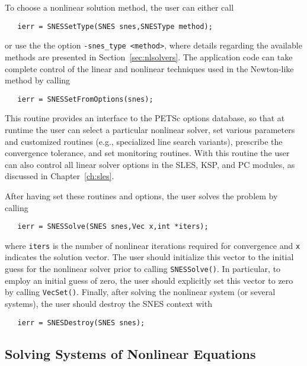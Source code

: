 To choose a nonlinear solution method, the user can either
call 
\begin{verbatim}
   ierr = SNESSetType(SNES snes,SNESType method);
\end{verbatim}
or use the the option {\tt -snes\_type <method>},  
where details regarding the available methods are presented in
Section~\ref{sec:nlsolvers}.
The application code can take complete control of the linear and
nonlinear techniques used in the Newton-like method by calling
\begin{verbatim}
   ierr = SNESSetFromOptions(snes);
\end{verbatim}
This routine provides an interface to the PETSc options database, so
that at runtime the user can select a particular nonlinear solver, set
various parameters and customized routines (e.g., specialized line
search variants), prescribe the convergence tolerance, and set
monitoring routines.  With this routine the user can also control all
linear solver options in the SLES, KSP, and PC modules, as discussed
in Chapter~\ref{ch:sles}.

After having set these routines and options, the user
solves the problem by calling 
\begin{verbatim}
   ierr = SNESSolve(SNES snes,Vec x,int *iters);
\end{verbatim}
where {\tt iters} is the number of nonlinear iterations required for
convergence and {\tt x} indicates the solution vector. The user should
initialize this vector to the initial guess for the nonlinear solver
prior to calling {\tt SNESSolve()}.  In particular, to employ an
initial guess of zero, the user should explicitly set this vector to
zero by calling {\tt VecSet()}.  Finally, after solving the nonlinear
system (or several systems), the user should destroy the SNES context
with
\begin{verbatim}
   ierr = SNESDestroy(SNES snes);
\end{verbatim}

\subsection{Solving Systems of Nonlinear Equations}
\label{sec:sneseq}

